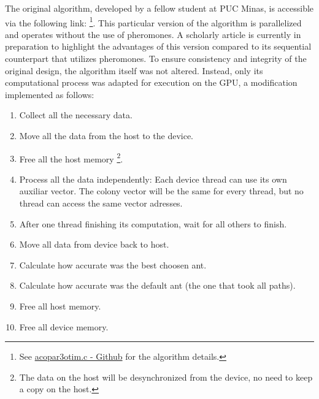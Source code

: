 The original algorithm, developed by a fellow student at PUC Minas, is accessible via the following link: \footnote{See \href{https://github.com/LucasSnatiago/Ant-Colony-ROCm/blob/main/examples/acopar3otim.c}{acopar3otim.c - Github} for the algorithm details.}. This particular version of the algorithm is parallelized and operates without the use of pheromones. A scholarly article is currently in preparation to highlight the advantages of this version compared to its sequential counterpart that utilizes pheromones. To ensure consistency and integrity of the original design, the algorithm itself was not altered. Instead, only its computational process was adapted for execution on the GPU, a modification implemented as follows:
\begin{enumerate}
    \item Collect all the necessary data.
    \item Move all the data from the host to the device.
    \item Free all the host memory \footnote{The data on the host will be desynchronized from the device, no need to keep a copy on the host.}.
    \item Process all the data independently:
    \subitem Each device thread can use its own auxiliar vector.
    \subitem The colony vector will be the same for every thread, but no thread can access the same vector adresses.
    \item After one thread finishing its computation, wait for all others to finish.
    \item Move all data from device back to host.
    \item Calculate how accurate was the best choosen ant.
    \item Calculate how accurate was the default ant (the one that took all paths).
    \item Free all host memory.
    \item Free all device memory.
\end{enumerate}
